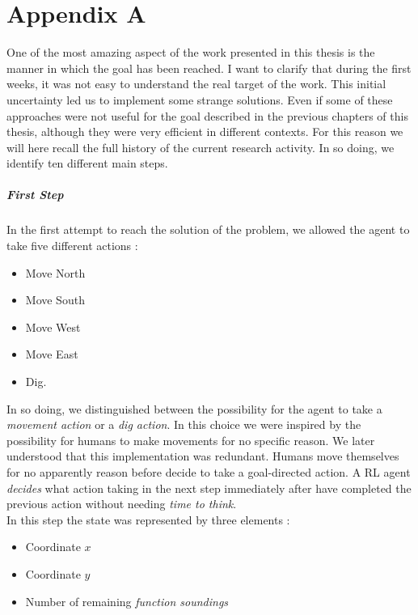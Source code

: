 \chapter{Appendix A}

One of the most amazing aspect of the work presented in this thesis is the manner in which the goal has been reached. I want to clarify that during the first weeks, it was not easy to understand the real target of the work. This initial uncertainty led us to implement some strange solutions. Even if some of these approaches were not useful for the goal described in the previous chapters of this thesis, although they were very efficient in different contexts. For this reason we will here recall the full history of the current research activity. In so doing, we identify ten different main steps. 

\paragraph{First Step} In the first attempt to reach the solution of the problem, we allowed the agent to take five different actions :

\begin{itemize}
	\item Move North
	\item Move South
	\item Move West
	\item Move East
	\item Dig.
\end{itemize}

In so doing, we distinguished between the possibility for the agent to take a \textit{movement action} or a \textit{dig action}. In this choice we were inspired by the possibility for humans to make movements for no specific reason. We later understood that this implementation was redundant. Humans move themselves for no apparently reason before decide to take a goal-directed action. A RL agent \textit{decides} what action taking in the next step immediately after have completed the previous action without needing \textit{time to think}. \\

In this step the state was represented by three elements :

\begin{itemize}
	\item Coordinate $x$
	\item Coordinate $y$
	\item Number of remaining \textit{function soundings}
\end{itemize}

